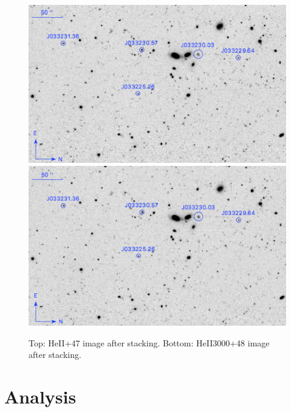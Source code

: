 \documentclass[twocolumn]{aastex6}
\begin{document}
\begin{figure}[ht!]
\centering
\includegraphics[scale=.61]{../Figures/HEII_final.png}
\includegraphics[scale=.61]{../Figures/HEII3000_final.png}
\caption{Top: HeII+47 image after stacking. Bottom: HeII3000+48 image after stacking. }
\label{fig:stacked_image}
\end{figure}
\section{Analysis}
\end{document}
